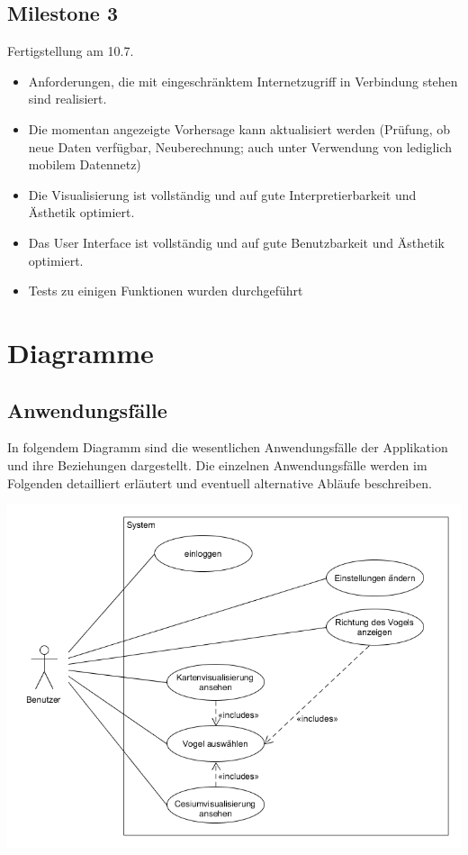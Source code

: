 \documentclass[12pt]{article} %
\begin{document}
\vspace{1em}

\subsection*{Milestone 3}
Fertigstellung am 10.7.
\begin{itemize} 
	\item Anforderungen, die mit eingeschränktem Internetzugriff in Verbindung stehen sind realisiert.
	\item Die momentan angezeigte Vorhersage kann aktualisiert werden (Prüfung, ob neue Daten verfügbar, Neuberechnung; auch unter Verwendung von lediglich mobilem Datennetz)
	\item Die Visualisierung ist vollständig und auf gute Interpretierbarkeit und Ästhetik optimiert.
	\item Das User Interface ist vollständig und auf gute Benutzbarkeit und Ästhetik optimiert.
	\item Tests zu einigen Funktionen wurden durchgeführt
\end{itemize} 



\newpage
\section{Diagramme} \label{diagramme}

\subsection{Anwendungsfälle}

In folgendem Diagramm sind die wesentlichen Anwendungsfälle der Applikation und ihre Beziehungen dargestellt. Die einzelnen Anwendungsfälle werden im Folgenden detailliert erläutert und eventuell alternative Abläufe beschreiben.

\includegraphics[width = 1\linewidth]{Usecasediagramm.png}
\end{document}
